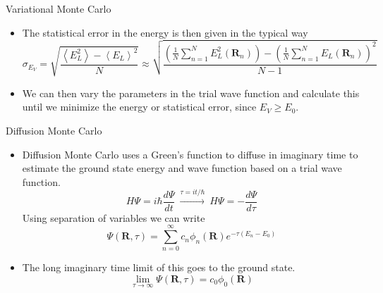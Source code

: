 \documentclass{beamer}
\newcommand{\R}{\mathbf{R}}
\begin{document}
\begin{frame}{Variational Monte Carlo}
\begin{itemize}
   \item The statistical error in the energy is then given in the typical way
   \begin{equation*}
      \sigma_{E_V} = \sqrt{\frac{\left<E_L^2\right>-\left<E_L\right>^2}{N}} \approx \sqrt{\frac{\left(\frac{1}{N}\sum\limits_{n=1}^NE_L^2(\R_n)\right) - \left(\frac{1}{N}\sum\limits_{n=1}^NE_L(\R_n)\right)^2}{N-1}}
   \end{equation*}
   \item We can then vary the parameters in the trial wave function and calculate this until we minimize the energy or statistical error, since $E_V \ge E_0$.
\end{itemize}
\end{frame}

\begin{frame}{Diffusion Monte Carlo}
\begin{itemize}
   \item Diffusion Monte Carlo uses a Green's function to diffuse in imaginary time to estimate the ground state energy and wave function based on a trial wave function.
   \begin{equation*}
      H\Psi = i\hbar\frac{d\Psi}{dt} ~ \xrightarrow{\tau=it/\hbar} ~ H\Psi = -\frac{d\Psi}{d\tau}
   \end{equation*}
   Using separation of variables we can write
   \begin{equation*}
      \Psi(\R,\tau) = \sum\limits_{n=0}^{\infty} c_n\phi_n(\R) e^{-\tau(E_n-E_0)}
   \end{equation*}
   \item The long imaginary time limit of this goes to the ground state.
   \begin{equation*}
      \lim\limits_{\tau\rightarrow\infty} \Psi(\R,\tau) = c_0\phi_0(\R)
   \end{equation*}
\end{itemize}
\end{frame}
\end{document}

